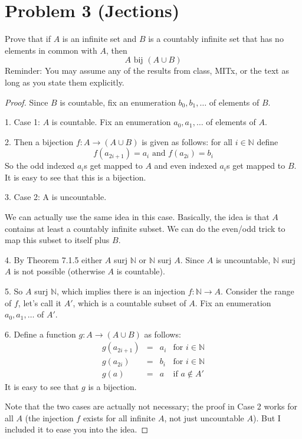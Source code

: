 \documentclass[14pt]{extarticle}
\begin{document}
\section{Problem 3 (Jections)}
Prove that if $A$ is an infinite set and $B$ is a countably infinite set that has no elements in common with $A$, then
$$
A \text{ bij } (A \cup B)
$$
Reminder: You may assume any of the results from class, MITx, or the text as long as you state them explicitly.
\begin{proof}
Since $B$ is countable, fix an enumeration $b_0, b_1, \ldots$ of elements of $B$.

1. Case 1: $A$ is countable. Fix an enumeration $a_0, a_1, \ldots$ of elements of $A$.

2. Then a bijection $f : A \to (A \cup B)$ is given as follows: for all $i \in \mathbb{N}$ define 
$$
f(a_{2i+1}) = a_i \text{ and } f(a_{2i}) = b_i
$$ 
So the odd indexed $a_i$s get mapped to $A$ and even indexed $a_i$s get mapped to $B$. It is easy to see that this is a bijection.

3. Case 2: A is uncountable.

We can actually use the same idea in this case. Basically, the idea is that $A$ contains at least a countably infinite subset. We can do the even/odd trick to map this subset to itself plus $B$.

4. By Theorem 7.1.5 either $A$ surj $\mathbb{N}$ or $\mathbb{N}$ surj $A$. Since $A$ is uncountable, $\mathbb{N}$ surj $A$ is not possible (otherwise $A$ is countable).

5. So $A$ surj $\mathbb{N}$, which implies there is an injection $f: \mathbb{N} \to A$. Consider the range of $f$, let's call it $A'$, which is a countable subset of $A$. Fix an enumeration $a_0, a_1, \ldots$ of $A'$.

6. Define a function $g: A \to (A \cup B)$ as follows:
$$
\begin{array}{cccc}
g(a_{2i+1}) & = & a_i & \text{for } i \in \mathbb{N} \\
g(a_{2i}) & = & b_i & \text{for } i \in \mathbb{N} \\
g(a) & = & a & \text{if } a \notin A'
\end{array}
$$
It is easy to see that $g$ is a bijection.

Note that the two cases are actually not necessary; the proof in Case 2 works for all $A$ (the injection $f$ exists for all infinite $A$, not just uncountable $A$). But I included it to ease you into the idea.
\end{proof}
\end{document}
